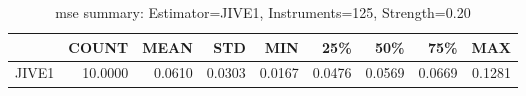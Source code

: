 \begin{table}[ht]
\centering
\caption{mse summary: Estimator=JIVE1, Instruments=125, Strength=0.20}
\begin{tabular}{lrrrrrrrr}
\toprule
 & COUNT & MEAN & STD & MIN & 25\% & 50\% & 75\% & MAX \\
\midrule
JIVE1 & 10.0000 & 0.0610 & 0.0303 & 0.0167 & 0.0476 & 0.0569 & 0.0669 & 0.1281 \\
\bottomrule
\end{tabular}
\end{table}
